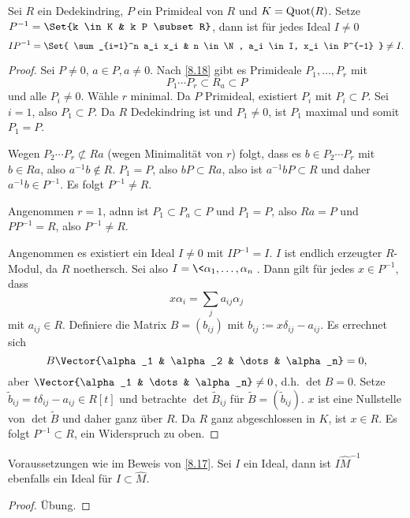 \begin{lem} \label{8.19}
	Sei $R$ ein Dedekindring, $P$ ein Primideal von $R$ und $K = \operatorname{Quot}(R)$.
	Setze $P^{-1} = \Set{k \in K & k P \subset R}$, dann ist für jedes Ideal $I \neq 0$
	\[
		I P^{-1} =
		\Set{ \sum_{i=1}^n a_i x_i & n \in \N, a_i \in I, x_i \in P^{-1} }
		\neq I.
	\]
	\begin{proof}
		Sei \oBdA $P \neq 0$, $a \in P, a \neq 0$.
		Nach \ref{8.18} gibt es Primideale $P_1, \dotsc, P_r$ mit
		\[
			P_1 \dotsb P_r \subset R_a \subset P
		\]
		und alle $P_i \neq 0$.
		Wähle $r$ minimal.
		Da $P$ Primideal, existiert $P_i$ mit $P_i \subset P$.
		Sei \oBdA $i = 1$, also $P_1 \subset P$.
		Da $R$ Dedekindring ist und $P_1 \neq 0$, ist $P_1$ maximal und somit $P_1 = P$.

		Wegen $P_2 \dotsb P_r \not\subset Ra$ (wegen Minimalität von $r$) folgt, dass es $b \in P_2 \dotsb P_r$ mit $b \in Ra$, also $a^{-1}b \not\in R$.
		$P_1 = P$, also $b P \subset Ra$, also ist $a^{-1}b P \subset R$ und daher $a^{-1} b \in P^{-1}$.
		Es folgt $P^{-1} \neq R$.

		Angenommen $r = 1$, adnn ist $P_1 \subset P_a \subset P$ und $P_1 = P$, also $Ra = P$ und $PP^{-1} = R$, also $P^{-1} \neq R$.

		Angenommen es existiert ein Ideal $I \neq 0$ mit $I P^{-1} = I$.
		$I$ ist endlich erzeugter $R$-Modul, da $R$ noethersch.
		Sei also $I = \<\alpha_1, \dotsc, \alpha_n\>$.
		Dann gilt für jedes $x \in P^{-1}$, dass
		\[
			x \alpha_i = \sum_{j} a_{ij} \alpha_j
		\]
		mit $a_{ij} \in R$.
		Definiere die Matrix $B = (b_{ij})$ mit $b_{ij} := x \delta_{ij} - a_{ij}$.
		Es errechnet sich
		\[
			B \Vector{\alpha_1 & \alpha_2 & \dots & \alpha_n} = 0,
		\]
		aber $\Vector{\alpha_1 & \dots & \alpha_n} \neq 0$, d.h. $\det B = 0$.
		Setze $\tilde b_{ij} = t \delta_{ij} - a_{ij} \in R[t]$ und betrachte $\det \tilde B_{ij}$ für $\tilde B = (\tilde b_{ij})$.
		$x$ ist eine Nullstelle von $\det \tilde B$ und daher ganz über $R$.
		Da $R$ ganz abgeschlossen in $K$, ist $x \in R$.
		Es folgt $P^{-1} \subset R$, ein Widerspruch zu oben.
	\end{proof}
\end{lem}

\begin{lem} \label{8.20}
	Voraussetzungen wie im Beweis von \ref{8.17}.
	Sei $I$ ein Ideal, dann ist $I \hat M^{-1}$ ebenfalls ein Ideal für $I \subset \hat M$.
	\begin{proof}
		Übung.
	\end{proof}
\end{lem}


